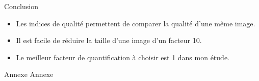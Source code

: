 \documentclass[xcolor=dvipsnames]{beamer}
\begin{document}
\begin{frame} {Conclusion}
    \begin{itemize}
        \item Les indices de qualité permettent de comparer la qualité d'une même image.
        \item Il est facile de réduire la taille d'une image d'un facteur 10.
        \item Le meilleur facteur de quantification à choisir est 1 dans mon étude.
    \end{itemize}



\end{frame}








\begin{frame} {Annexe}
    \Huge Annexe
\end{frame}
\end{document}
